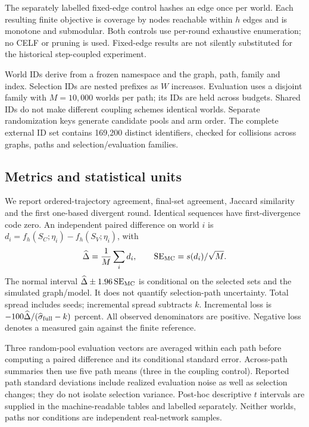 \documentclass[smallextended]{svjour3}
\begin{document}
The separately labelled fixed-edge control hashes an edge once per world. Each resulting finite objective is coverage by nodes reachable within $h$ edges and is monotone and submodular. Both controls use per-round exhaustive enumeration; no CELF or pruning is used. Fixed-edge results are not silently substituted for the historical step-coupled experiment.

World IDs derive from a frozen namespace and the graph, path, family and index. Selection IDs are nested prefixes as $W$ increases. Evaluation uses a disjoint family with $M=10,000$ worlds per path; its IDs are held across budgets. Shared IDs do not make different coupling schemes identical worlds. Separate randomization keys generate candidate pools and arm order. The complete external ID set contains 169,200 distinct identifiers, checked for collisions across graphs, paths and selection/evaluation families.

\subsection{Metrics and statistical units}
We report ordered-trajectory agreement, final-set agreement, Jaccard similarity and the first one-based divergent round. Identical sequences have first-divergence code zero. An independent paired difference on world $i$ is $d_i=f_h(S_C;\eta_i)-f_h(S_V;\eta_i)$, with
\begin{equation}
\widehat\Delta=\frac{1}{M}\sum_i d_i,\qquad
\operatorname{SE}_{\rm MC}=s(d_i)/\sqrt M.
\end{equation}
The normal interval $\widehat\Delta\pm1.96\operatorname{SE}_{\rm MC}$ is conditional on the selected sets and the simulated graph/model. It does not quantify selection-path uncertainty. Total spread includes seeds; incremental spread subtracts $k$. Incremental loss is $-100\widehat\Delta/(\widehat\sigma_{\rm full}-k)$ percent. All observed denominators are positive. Negative loss denotes a measured gain against the finite reference.

Three random-pool evaluation vectors are averaged within each path before computing a paired difference and its conditional standard error. Across-path summaries then use five path means (three in the coupling control). Reported path standard deviations include realized evaluation noise as well as selection changes; they do not isolate selection variance. Post-hoc descriptive $t$ intervals are supplied in the machine-readable tables and labelled separately. Neither worlds, paths nor conditions are independent real-network samples.
\end{document}
